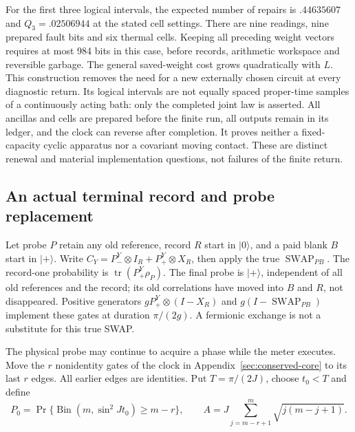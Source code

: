 For the first three logical intervals, the expected number of repairs is
$.44635607$ and $Q_3=.02506944$ at the stated cell settings.
There are nine readings, nine prepared fault bits and six thermal cells.
Keeping all preceding weight vectors requires at most 984 bits in this
case, before records, arithmetic workspace and reversible garbage.
The general saved-weight cost grows quadratically with $L$.
This construction removes the need for a new externally chosen circuit
at every diagnostic return. Its logical intervals are not equally spaced
proper-time samples of a continuously acting bath: only the completed
joint law is asserted. All ancillas and cells are prepared before the
finite run, all outputs remain in its ledger, and the clock can reverse
after completion. It proves neither a fixed-capacity cyclic apparatus
nor a covariant moving contact. These are distinct renewal and material
implementation questions, not failures of the finite return.

\subsection{An actual terminal record and probe replacement}
\label{sec:terminal-meter}

Let probe $P$ retain any old reference, record $R$ start in $|0\rangle$,
and a paid blank $B$ start in $|+\rangle$. Write
$C_Y=P_-^Y\otimes I_R+P_+^Y\otimes X_R$, then apply the true
$\operatorname{SWAP}_{PB}$. The record-one probability is
$\operatorname{tr}(P_+^Y\rho_P)$. The final probe is $|+\rangle$,
independent of all old references and the record; its old correlations
have moved into $B$ and $R$, not disappeared. Positive generators
$gP_+^Y\otimes(I-X_R)$ and $g(I-\operatorname{SWAP}_{PB})$ implement
these gates at duration $\pi/(2g)$. A fermionic exchange is not a
substitute for this true SWAP.

The physical probe may continue to acquire a phase while the meter
executes. Move the $r$ nonidentity gates of the clock in
Appendix~\ref{sec:conserved-core} to its last $r$ edges. All earlier
edges are identities. Put $T=\pi/(2J)$, choose $t_0<T$ and define
\[
 P_0=\Pr\{\operatorname{Bin}(m,\sin^2Jt_0)\ge m-r\},\qquad
 A=J\sum_{j=m-r+1}^m\sqrt{j(m-j+1)}.
\]

